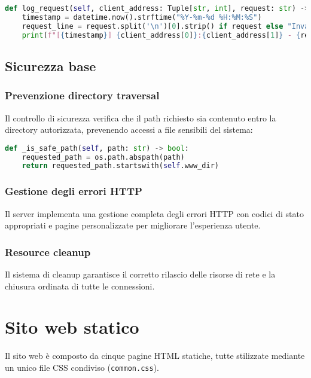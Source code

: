 \documentclass[a4paper,12pt]{report}
\begin{document}
\begin{lstlisting}[language=Python]
def log_request(self, client_address: Tuple[str, int], request: str) -> None:
    timestamp = datetime.now().strftime("%Y-%m-%d %H:%M:%S")
    request_line = request.split('\n')[0].strip() if request else "Invalid request"
    print(f"[{timestamp}] {client_address[0]}:{client_address[1]} - {request_line}")
\end{lstlisting}

\section{Sicurezza base}

\subsection{Prevenzione directory traversal}

Il controllo di sicurezza verifica che il path richiesto sia contenuto entro la directory autorizzata, prevenendo accessi a file sensibili del sistema:

\begin{lstlisting}[language=Python]
def _is_safe_path(self, path: str) -> bool:
    requested_path = os.path.abspath(path)
    return requested_path.startswith(self.www_dir)
\end{lstlisting}

\subsection{Gestione degli errori HTTP}

Il server implementa una gestione completa degli errori HTTP con codici di stato appropriati e pagine personalizzate per migliorare l'esperienza utente.

\subsection{Resource cleanup}

Il sistema di cleanup garantisce il corretto rilascio delle risorse di rete e la chiusura ordinata di tutte le connessioni.

\chapter{Sito web statico}

Il sito web è composto da cinque pagine HTML statiche, tutte stilizzate mediante un unico file CSS condiviso (\texttt{common.css}).
\end{document}
